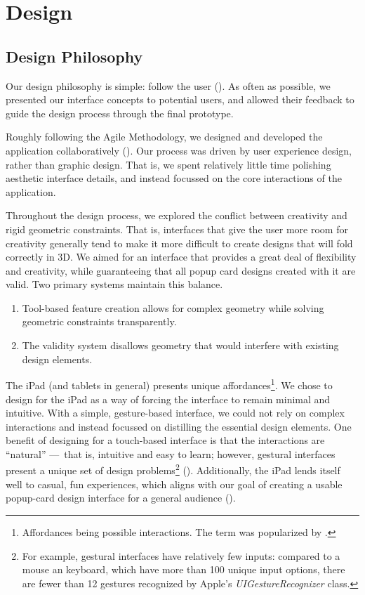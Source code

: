 \chapter{Design}

\section{Design Philosophy}\label{design-philosophy}

Our design philosophy is simple: follow the user
(\citet{bell2008design}). As often as possible, we presented our
interface concepts to potential users, and allowed their feedback to
guide the design process through the final prototype.

Roughly following the Agile Methodology, we designed and developed the
application collaboratively (\citet{martin2003agile}). Our process was
driven by user experience design, rather than graphic design. That is,
we spent relatively little time polishing aesthetic interface details,
and instead focussed on the core interactions of the application.

Throughout the design process, we explored the conflict between
creativity and rigid geometric constraints. That is, interfaces that
give the user more room for creativity generally tend to make it more
difficult to create designs that will fold correctly in 3D. We aimed for
an interface that provides a great deal of flexibility and creativity,
while guaranteeing that all popup card designs created with it are
valid. Two primary systems maintain this balance.

\begin{enumerate}
\def\labelenumi{\arabic{enumi})}
\itemsep1pt\parskip0pt
\item
  Tool-based feature creation allows for complex geometry while solving
  geometric constraints transparently.
\item
  The validity system disallows geometry that would interfere with
  existing design elements.
\end{enumerate}

The iPad (and tablets in general) presents unique affordances\footnote{Affordances
  being possible interactions. The term was popularized by
  \citet{norman2013design}.}. We chose to design for the iPad as a way
of forcing the interface to remain minimal and intuitive. With a simple,
gesture-based interface, we could not rely on complex interactions and
instead focussed on distilling the essential design elements. One
benefit of designing for a touch-based interface is that the
interactions are ``natural'' ---~that is, intuitive and easy to learn;
however, gestural interfaces present a unique set of design
problems\footnote{For example, gestural interfaces have relatively few
  inputs: compared to a mouse an keyboard, which have more than 100
  unique input options, there are fewer than 12 gestures recognized by
  Apple's \emph{UIGestureRecognizer} class.}
(\citet{norman2010gestural}). Additionally, the iPad lends itself well
to casual, fun experiences, which aligns with our goal of creating a
usable popup-card design interface for a general audience
(\citet{johansen2013ipad}).


